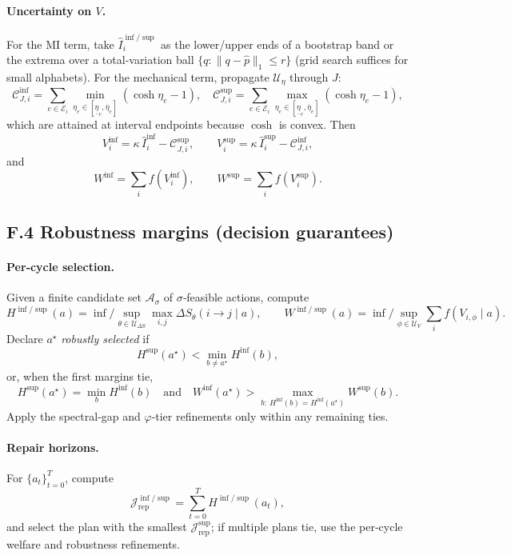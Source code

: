 \documentclass[11pt]{article}
\begin{document}
\paragraph{Uncertainty on $V$.}
For the MI term, take $\widehat{I}_i^{\inf/\sup}$ as the lower/upper ends of a bootstrap band or the extrema over a total‑variation ball $\{q: \|q-\hat p\|_1\le r\}$ (grid search suffices for small alphabets). For the mechanical term, propagate $\mathcal{U}_\eta$ through $J$:
\[
\mathcal{C}_{J,i}^{\inf}=\sum_{e\in \mathcal{E}_i}\min_{\eta_e\in [\underline\eta_e,\overline\eta_e]}(\cosh\eta_e-1),\quad
\mathcal{C}_{J,i}^{\sup}=\sum_{e\in \mathcal{E}_i}\max_{\eta_e\in [\underline\eta_e,\overline\eta_e]}(\cosh\eta_e-1),
\]
which are attained at interval endpoints because $\cosh$ is convex. Then
\[
V_i^{\inf}=\kappa\,\widehat{I}_i^{\inf}-\mathcal{C}_{J,i}^{\sup},\qquad
V_i^{\sup}=\kappa\,\widehat{I}_i^{\sup}-\mathcal{C}_{J,i}^{\inf},
\]
and
\[
W^{\inf}=\sum_i f(V_i^{\inf}),\qquad W^{\sup}=\sum_i f(V_i^{\sup}).
\]

\subsection*{F.4 Robustness margins (decision guarantees)}

\paragraph{Per‑cycle selection.}
Given a finite candidate set $\mathcal{A}_\sigma$ of $\sigma$‑feasible actions, compute
\[
H^{\inf/\sup}(a)=\inf/\sup_{\theta\in \mathcal{U}_{\Delta S}} \max_{i,j}\Delta S_\theta(i\!\to\! j\mid a),\qquad
W^{\inf/\sup}(a)=\inf/\sup_{\phi\in \mathcal{U}_V} \sum_i f(V_{i,\phi}\mid a).
\]
Declare $a^\star$ \emph{robustly selected} if
\[
H^{\sup}(a^\star)<\min_{b\neq a^\star} H^{\inf}(b),
\]
or, when the first margins tie,
\[
H^{\sup}(a^\star)=\min_{b} H^{\inf}(b)\quad\text{and}\quad
W^{\inf}(a^\star)>\max_{b:\ H^{\inf}(b)=H^{\inf}(a^\star)} W^{\sup}(b).
\]
Apply the spectral‑gap and $\varphi$‑tier refinements only within any remaining ties.

\paragraph{Repair horizons.}
For $\{a_t\}_{t=0}^T$, compute
\[
\mathcal{J}_{\mathrm{rep}}^{\inf/\sup}=\sum_{t=0}^T H^{\inf/\sup}(a_t),
\]
and select the plan with the smallest $\mathcal{J}_{\mathrm{rep}}^{\sup}$; if multiple plans tie, use the per‑cycle welfare and robustness refinements.
\end{document}
